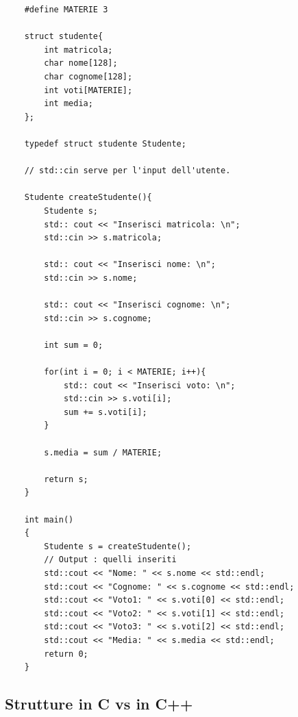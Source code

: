 \begin{lstlisting}
	#define MATERIE 3
	
	struct studente{
		int matricola;
		char nome[128];
		char cognome[128];
		int voti[MATERIE];
		int media;
	};

	typedef struct studente Studente;
	
	// std::cin serve per l'input dell'utente.

	Studente createStudente(){
		Studente s;
		std:: cout << "Inserisci matricola: \n";
		std::cin >> s.matricola;
		
		std:: cout << "Inserisci nome: \n";
		std::cin >> s.nome;
		
		std:: cout << "Inserisci cognome: \n";
		std::cin >> s.cognome;
		
		int sum = 0;
		
		for(int i = 0; i < MATERIE; i++){
			std:: cout << "Inserisci voto: \n";
			std::cin >> s.voti[i];
			sum += s.voti[i];
		}
	
		s.media = sum / MATERIE;
		
		return s;
	}

	int main()
	{
		Studente s = createStudente();
		// Output : quelli inseriti
		std::cout << "Nome: " << s.nome << std::endl;
		std::cout << "Cognome: " << s.cognome << std::endl;
		std::cout << "Voto1: " << s.voti[0] << std::endl;
		std::cout << "Voto2: " << s.voti[1] << std::endl;
		std::cout << "Voto3: " << s.voti[2] << std::endl;
		std::cout << "Media: " << s.media << std::endl;
		return 0;
	}
\end{lstlisting}

\subsection{Strutture in C vs in C++}

